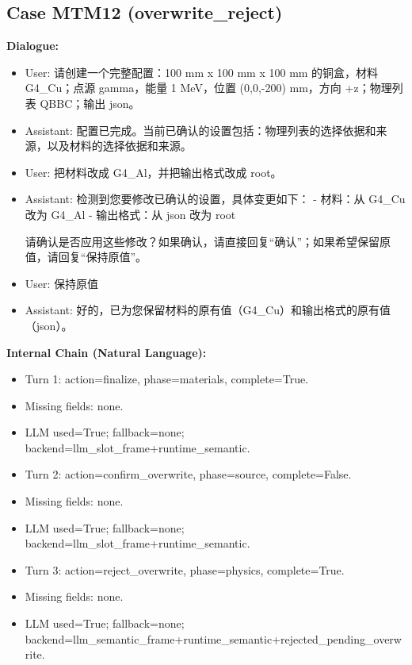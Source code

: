 \documentclass[11pt]{ctexart}
\begin{document}
\subsection{Case MTM12 (overwrite\_reject)}
\textbf{Dialogue:}
\begin{itemize}
\item User: 请创建一个完整配置：100 mm x 100 mm x 100 mm 的铜盒，材料 G4\_Cu；点源 gamma，能量 1 MeV，位置 (0,0,-200) mm，方向 +z；物理列表 QBBC；输出 json。
\item Assistant: 配置已完成。当前已确认的设置包括：物理列表的选择依据和来源，以及材料的选择依据和来源。
\item User: 把材料改成 G4\_Al，并把输出格式改成 root。
\item Assistant: 检测到您要修改已确认的设置，具体变更如下：
- 材料：从 G4\_Cu 改为 G4\_Al
- 输出格式：从 json 改为 root

请确认是否应用这些修改？如果确认，请直接回复“确认”；如果希望保留原值，请回复“保持原值”。
\item User: 保持原值
\item Assistant: 好的，已为您保留材料的原有值（G4\_Cu）和输出格式的原有值（json）。
\end{itemize}
\textbf{Internal Chain (Natural Language):}
\begin{itemize}
\item Turn 1: action=finalize, phase=materials, complete=True.
\item Missing fields: none.
\item LLM used=True; fallback=none; backend=llm\_slot\_frame+runtime\_semantic.
\item Turn 2: action=confirm\_overwrite, phase=source, complete=False.
\item Missing fields: none.
\item LLM used=True; fallback=none; backend=llm\_slot\_frame+runtime\_semantic.
\item Turn 3: action=reject\_overwrite, phase=physics, complete=True.
\item Missing fields: none.
\item LLM used=True; fallback=none; backend=llm\_semantic\_frame+runtime\_semantic+rejected\_pending\_overwrite.
\end{itemize}
\end{document}
